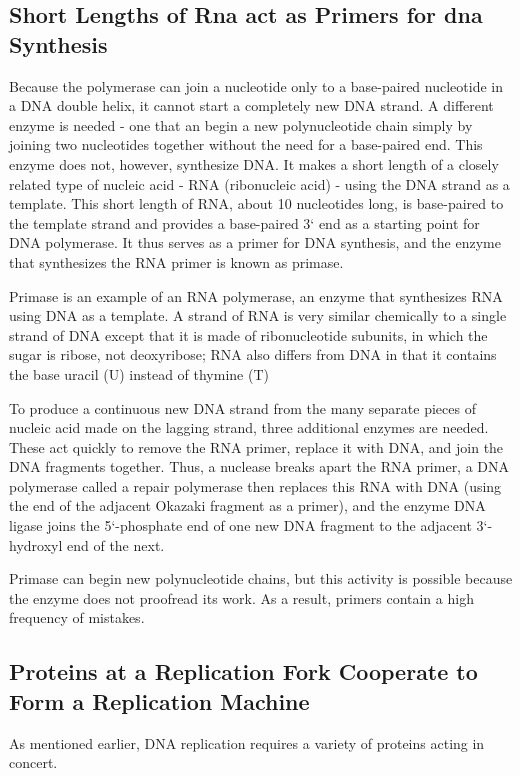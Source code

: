 \subsection{Short Lengths of Rna act as Primers for dna Synthesis}

Because the polymerase can join a nucleotide
only to a base-paired nucleotide in a DNA double helix, it cannot start
a completely new DNA strand. A different enzyme is needed - one that
an begin a new polynucleotide chain simply by joining two nucleotides
together without the need for a base-paired end. This enzyme does not,
however, synthesize DNA. It makes a short length of a closely related type
of nucleic acid - RNA (ribonucleic acid) - using the DNA strand as a template.
This short length of RNA, about 10 nucleotides long, is base-paired
to the template strand and provides a base-paired 3` end as a starting
point for DNA polymerase. It thus serves as a primer for DNA synthesis,
and the enzyme that synthesizes the RNA primer is known as primase.

Primase is an example of an RNA polymerase, an enzyme that synthesizes
RNA using DNA as a template. A strand of RNA is very similar chemically
to a single strand of DNA except that it is made of ribonucleotide
subunits, in which the sugar is ribose, not deoxyribose; RNA also differs
from DNA in that it contains the base uracil (U) instead of thymine (T)

To produce a continuous new DNA strand from the many separate pieces
of nucleic acid made on the lagging strand, three additional enzymes are
needed. These act quickly to remove the RNA primer, replace it with DNA,
and join the DNA fragments together. Thus, a nuclease breaks apart the
RNA primer, a DNA polymerase called a repair polymerase then replaces
this RNA with DNA (using the end of the adjacent Okazaki fragment as
a primer), and the enzyme DNA ligase joins the 5`-phosphate end of one
new DNA fragment to the adjacent 3`-hydroxyl end of the next.

Primase can begin new polynucleotide chains, but this activity is possible
because the enzyme does not proofread its work. As a result, primers
contain a high frequency of mistakes.

\subsection{Proteins at a Replication Fork Cooperate to Form a Replication Machine}

As mentioned earlier, DNA replication requires a variety of proteins acting in concert.

